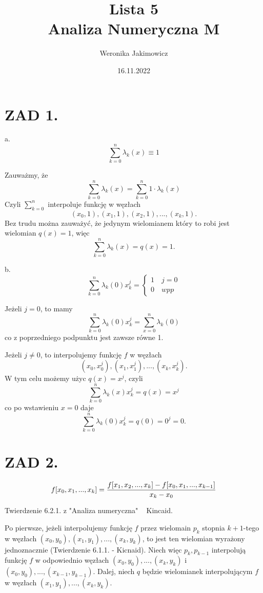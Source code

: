 \documentclass{article}[16pt]
\title{Lista 5\\\large Analiza Numeryczna M}
\author{Weronika Jakimowicz}
\date{16.11.2022}
\begin{document}
\maketitle

\section*{ZAD 1.}

a.
$$\sum\limits_{k=0}^n\lambda_k(x)\equiv 1$$

Zauważmy, że
$$\sum\limits_{k=0}^n\lambda_k(x)=\sum\limits_{k=0}^n1\cdot\lambda_k(x)$$
Czyli $\sum\limits_{k=0}^n$ interpoluje funkcję w węzłach
$$(x_0, 1),(x_1,1),(x_2,1),...,(x_k,1).$$
Bez trudu można zauważyć, że jedynym wielomianem który to robi jest wielomian $q(x)=1$, więc
$$\sum\limits_{k=0}^n\lambda_k(x)=q(x)=1.$$
\medskip

b.
$$\sum\limits_{k=0}^n\lambda_k(0)x_k^j=\begin{cases}1\quad j=0\\0\quad wpp\end{cases}$$

Jeżeli $j=0$, to mamy
$$\sum\limits_{k=0}^n\lambda_k(0)x_k^j=\sum\limits_{x=0}^n\lambda_k(0)$$
co z poprzedniego podpunktu jest zawsze równe 1.
\smallskip

Jeżeli $j\neq 0$, to interpolujemy funkcję $f$ w węzłach
$$(x_0,x_0^j),(x_1,x_1^j),...,(x_k,x_k^j).$$
W tym celu możemy użyc $q(x)=x^j$, czyli
$$\sum\limits_{k=0}^n\lambda_k(x)x_k^j=q(x)=x^j$$
co po wstawieniu $x=0$ daje
$$\sum\limits_{k=0}^n\lambda_k(0)x_k^j=q(0)=0^j=0.$$

\section*{ZAD 2.}

\begin{align*}
    f[x_0,x_1,...,x_k]={f[x_1,x_2,...,x_k]-f[x_0,x_1,...,x_{k-1}]\over x_k-x_0}
\end{align*}

Twierdzenie 6.2.1. z "Analiza numeryczna" ~ Kincaid.

Po pierwsze, jeżeli interpolujemy funkcję $f$ przez wielomain $p_k$ stopnia $k+1$-tego w węzłach $(x_0,y_0), (x_1,y_1),...,(x_k, y_k)$, to jest ten wielomian wyrażony jednoznacznie (Twierdzenie 6.1.1. - Kicnaid). Niech więc $p_k,p_{k-1}$ interpolują funkcję $f$ w odpowiednio węzłach $(x_0,y_0),...,(x_k,y_k)$ i $(x_0,y_0),...,(x_{k-1},y_{k-1})$. Dalej, niech $q$ będzie wielomianek interpolującym $f$ w węzłach $(x_1,y_1),...,(x_k,y_k)$.
\medskip
\end{document}
